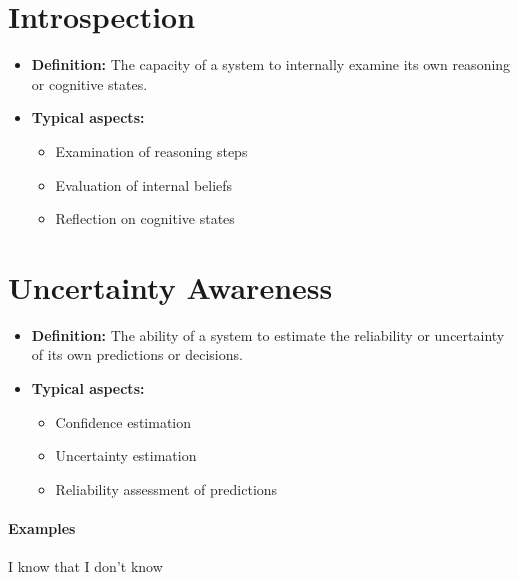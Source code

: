 \documentclass[a4paper]{article}
\begin{document}
    
    \section{Introspection}
    \begin{itemize}
        \item \textbf{Definition:} The capacity of a system to internally examine its own reasoning or cognitive states.
        \item \textbf{Typical aspects:}
        \begin{itemize}
            \item Examination of reasoning steps
            \item Evaluation of internal beliefs
            \item Reflection on cognitive states
        \end{itemize}
    \end{itemize}
    
    
    \section{Uncertainty Awareness}
    \begin{itemize}
        \item \textbf{Definition:} The ability of a system to estimate the reliability or uncertainty of its own predictions or decisions.
        \item \textbf{Typical aspects:}
        \begin{itemize}
            \item Confidence estimation
            \item Uncertainty estimation
            \item Reliability assessment of predictions
        \end{itemize}
    \end{itemize}
    
    \paragraph{Examples}
        I know that I don't know
    
    
\end{document}
